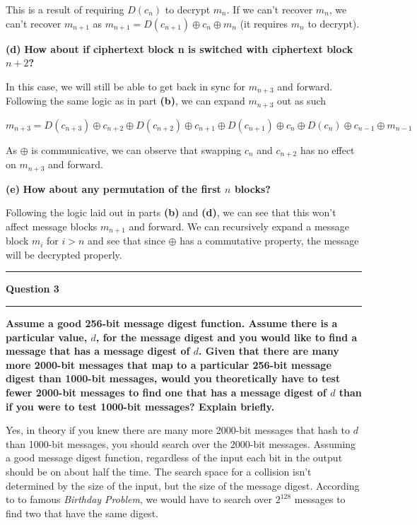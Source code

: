 \documentclass[11pt]{article}
\newcommand\question[2]{\vspace{.25in}\hrule\textbf{#1}\vspace{.5em}\hrule\vspace{.10in}}
\renewcommand\part[1]{\vspace{.10in}\textbf{(#1)}}
\begin{document}
This is a result of requiring $D(c_n)$ to decrypt $m_n$. If we can't recover $m_n$, we can't recover $m_{n+1}$ as $m_{n+1} = D(c_{n+1}) \oplus c_n \oplus m_n$ (it requires $m_n$ to decrypt).

\part{d} \textbf{How about if ciphertext block n is switched with ciphertext block $n + 2$?} \newline

In this case, we will still be able to get back in sync for $m_{n+3}$ and forward. Following the same logic as in part \textbf{(b)}, we can expand $m_{n+3}$ out as such

$$m_{n+3} = D(c_{n+3}) \oplus c_{n + 2} \oplus D(c_{n+2}) \oplus c_{n+1} \oplus D(c_{n+1}) \oplus c_{n} \oplus D(c_n) \oplus c_{n-1} \oplus m_{n-1}$$

As $\oplus$ is communicative, we can observe that swapping $c_n$ and $c_{n+2}$ has no effect on $m_{n+3}$ and forward.

\part{e} \textbf{How about any permutation of the first $n$ blocks?} \newline

Following the logic laid out in parts \textbf{(b)} and \textbf{(d)}, we can see that this won't affect message blocks $m_{n+1}$ and forward. We can recursively expand a message block $m_i$ for $i > n$ and see that since $\oplus$ has a commutative property, the message will be decrypted properly.

\question{Question 3}

\part{a} \textbf{Assume a good 256-bit message digest function. Assume there is a
particular value, $d$, for the message digest and you would like to find a message
that has a message digest of $d$. Given that there are many more 2000-bit messages
that map to a particular 256-bit message digest than 1000-bit messages, would
you theoretically have to test fewer 2000-bit messages to find one that has a
message digest of $d$ than if you were to test 1000-bit messages? Explain briefly.} \newline

Yes, in theory if you knew there are many more 2000-bit messages that hash to $d$ than 1000-bit messages, you should search over the 2000-bit messages. Assuming a good message digest function, regardless of the input each bit in the output should be on about half the time. The search space for a collision isn't determined by the size of the input, but the size of the message digest. According to to famous \textit{Birthday Problem}, we would have to search over $2^{128}$ messages to find two that have the same digest.
\end{document}
